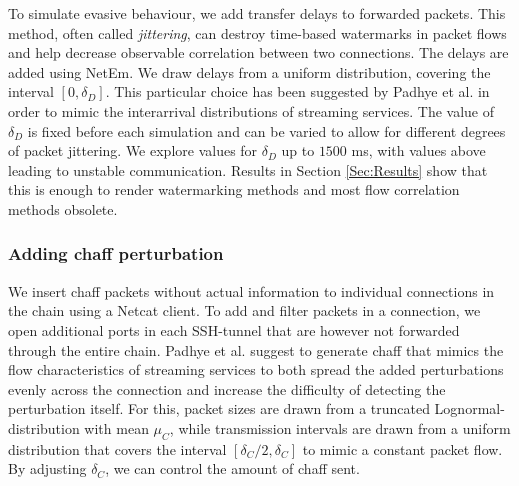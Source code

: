 \documentclass[runningheads,11pt]{llncs}\usepackage[]{graphicx}\usepackage[]{color}
\begin{document}
To simulate evasive behaviour, we add transfer delays to forwarded packets. This method, often called \textit{jittering}, can destroy time-based watermarks in packet flows and help decrease observable correlation between two connections. The delays are added using NetEm. We draw delays from a uniform distribution, covering the interval $[0,\delta_D]$. This particular choice has been suggested by Padhye et al. \cite{padhye2010evading} in order to mimic the interarrival distributions of streaming services. The value of $\delta_D$ is fixed before each simulation and can be varied to allow for different degrees of packet jittering. We explore values for $\delta_D$ up to $1500$ ms, with values above leading to unstable communication. Results in Section \ref{Sec:Results} show that this is enough to render watermarking methods and most flow correlation methods obsolete.



\vspace{-0.6cm}
\subsubsection{Adding chaff perturbation}\label{Sec:chaff_desc}

We insert chaff packets without actual information to individual connections in the chain using a Netcat client. %
To add and filter packets in a connection, we open additional ports in each SSH-tunnel that are however not forwarded through the entire chain. %
Padhye et al. \cite{padhye2010evading} suggest to generate chaff that mimics the flow characteristics of streaming services to both spread the added perturbations evenly across the connection and increase the difficulty of detecting the perturbation itself.
For this, packet sizes are drawn from a truncated Lognormal-distribution with mean $\mu_C$, while transmission intervals are drawn from a uniform distribution that covers the interval $[\delta_C/2,\delta_C]$ to mimic a constant packet flow. By adjusting $\delta_C$, we can control the amount of chaff sent.
\end{document}
